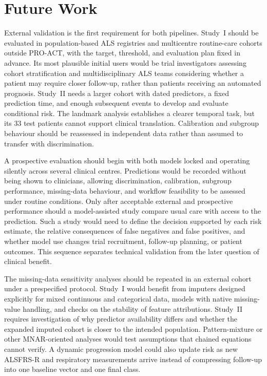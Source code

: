\section{Future Work}
\label{sec:conclusion_future}

External validation is the first requirement for both pipelines. Study~I should be evaluated in population-based ALS registries and multicentre routine-care cohorts outside PRO-ACT, with the target, threshold, and evaluation plan fixed in advance. Its most plausible initial users would be trial investigators assessing cohort stratification and multidisciplinary ALS teams considering whether a patient may require closer follow-up, rather than patients receiving an automated prognosis. Study~II needs a larger cohort with dated predictors, a fixed prediction time, and enough subsequent events to develop and evaluate conditional risk. The landmark analysis establishes a clearer temporal task, but its 33 test patients cannot support clinical translation. Calibration and subgroup behaviour should be reassessed in independent data rather than assumed to transfer with discrimination.

A prospective evaluation should begin with both models locked and operating silently across several clinical centres. Predictions would be recorded without being shown to clinicians, allowing discrimination, calibration, subgroup performance, missing-data behaviour, and workflow feasibility to be assessed under routine conditions. Only after acceptable external and prospective performance should a model-assisted study compare usual care with access to the prediction. Such a study would need to define the decision supported by each risk estimate, the relative consequences of false negatives and false positives, and whether model use changes trial recruitment, follow-up planning, or patient outcomes. This sequence separates technical validation from the later question of clinical benefit.

The missing-data sensitivity analyses should be repeated in an external cohort under a prespecified protocol. Study~I would benefit from imputers designed explicitly for mixed continuous and categorical data, models with native missing-value handling, and checks on the stability of feature attributions. Study~II requires investigation of why predictor availability differs and whether the expanded imputed cohort is closer to the intended population. Pattern-mixture or other \gls{MNAR}-oriented analyses would test assumptions that chained equations cannot verify. A dynamic progression model could also update risk as new \gls{ALSFRS-R} and respiratory measurements arrive instead of compressing follow-up into one baseline vector and one final class.

